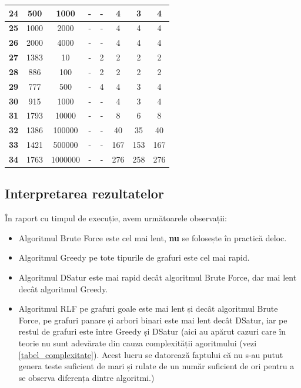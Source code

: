 \documentclass[runningheads]{llncs}
\begin{document}
\begin{table}[!]
\begin{tabular}{|c|c|c|c|c|c|c|c|}
\textbf{24} & 500 & 1000 & - & - & 4 & 3 & 4 \\ \hline 
\textbf{25} & 1000 & 2000 & - & - & 4 & 4 & 4 \\ \hline 
\textbf{26} & 2000 & 4000 & - & - & 4 & 4 & 4 \\ \hline 
\textbf{27} & 1383 & 10 & - & 2 & 2 & 2 & 2 \\ \hline 
\textbf{28} & 886 & 100 & - & 2 & 2 & 2 & 2 \\ \hline 
\textbf{29} & 777 & 500 & - & 4 & 4 & 3 & 4 \\ \hline 
\textbf{30} & 915 & 1000 & - & - & 4 & 3 & 4 \\ \hline 
\textbf{31} & 1793 & 10000 & - & - & 8 & 6 & 8 \\ \hline 
\textbf{32} & 1386 & 100000 & - & - & 40 & 35 & 40 \\ \hline 
\textbf{33} & 1421 & 500000 & - & - & 167 & 153 & 167 \\ \hline 
\textbf{34} & 1763 & 1000000 & - & - & 276 & 258 & 276 \\ \hline 
\end{tabular}
\end{table}

\subsection{Interpretarea rezultatelor}
În raport cu timpul de execuție, avem următoarele observații:
\begin{itemize}
    \item Algoritmul Brute Force este cel mai lent, \textbf{nu} se folosește
    în practică deloc.
    \item Algoritmul Greedy pe tote tipurile de grafuri este cel mai rapid.
    \item Algoritmul DSatur este mai rapid decât algoritmul Brute Force, dar
    mai lent decât algoritmul Greedy.
    \item Algoritmul RLF pe grafuri goale este mai lent și decât algoritmul
    Brute Force, pe grafuri panare și arbori binari este mai lent decât DSatur, 
    iar pe restul de grafuri este între Greedy și DSatur (aici au apărut cazuri
    care în teorie nu sunt adevărate din cauza complexității agoritmului (vezi \ref{tabel_complexitate}).
    Acest lucru se datorează faptului că nu s-au putut genera teste suficient de
    mari și rulate de un număr suficient de ori pentru a se observa diferența dintre algoritmi.)

\end{itemize}
\end{document}
